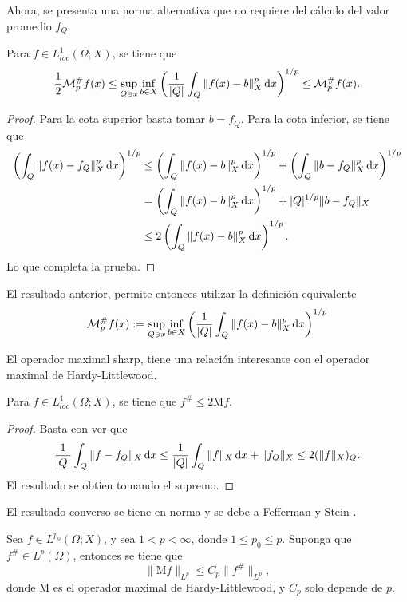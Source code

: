 Ahora, se presenta una norma alternativa que no requiere del cálculo del valor promedio $f_Q$.
\begin{proposition}
	Para $f\in L^1_{loc}(\Omega;X)$, se tiene que 
	\begin{equation*}
		\frac{1}{2}\mathcal{M}_p^\# f(x) \leq \sup_{Q\ni x} \inf_{b\in X}\left(\frac{1}{|Q|} \int_Q \|f(x)-b\|_X^p\mathop{}\!\mathrm{d} x\right)^{1/p} \leq \mathcal{M}_p^\# f(x). 
	\end{equation*}
\end{proposition}
\begin{proof}
	Para la cota superior basta tomar $b=f_Q$. Para la cota inferior, se tiene que
	\begin{align*}
		\left(\int_Q \|f(x) - f_Q\|_X^p\mathop{}\!\mathrm{d} x\right)^{1/p} & \leq \left(\int_Q \|f(x) - b\|_X^p \mathop{}\!\mathrm{d} x\right)^{1/p} + \left(\int_Q \|b- f_Q\|_X^p\mathop{}\!\mathrm{d} x\right)^{1/p} \\
		& =  \left(\int_Q \|f(x) - b\|_X^p \mathop{}\!\mathrm{d} x\right)^{1/p} + |Q|^{1/p}\|b-f_Q\|_X\\
		& \leq 2 \left(\int_Q \|f(x) - b\|_X^p \mathop{}\!\mathrm{d} x\right)^{1/p}.
	\end{align*}
	Lo que completa la prueba.
\end{proof}
\begin{remark}
	El resultado anterior, permite entonces utilizar la definición equivalente 
	\begin{equation*}
		\mathcal{M}_p^\# f(x) := \sup_{Q\ni x} \inf_{b\in X}\left(\frac{1}{|Q|} \int_Q \|f(x)-b\|_X^p\mathop{}\!\mathrm{d} x\right)^{1/p} 
	\end{equation*}
\end{remark}
El operador maximal sharp, tiene una relación interesante con el operador maximal de Hardy-Littlewood.
\begin{theorem}
	Para $f\in L^1_{loc}(\Omega;X)$, se tiene que $f^\# \leq 2\mathrm{M}f$.
\end{theorem}
\begin{proof}
	Basta con ver que 
	\begin{equation*}
		\frac{1}{|Q|}\int_Q\|f-f_Q\|_X \mathop{}\!\mathrm{d} x \leq \frac{1}{|Q|} \int_Q \|f\|_X\mathop{}\!\mathrm{d} x + \|f_Q\|_X \leq 2(\|f\|_X)_Q.
	\end{equation*}
	El resultado se obtien tomando el supremo.
\end{proof}
El resultado converso se tiene en norma y se debe a Fefferman y Stein \cite{fefferman-stein}.
\begin{theorem}\label{theo:sharp-hardy-littlewood}
	Sea $f\in L^{p_0}(\Omega; X)$, y sea $1<p<\infty$, donde $1\leq p_0\leq p$. Suponga que $f^\#\in L^p(\Omega)$, entonces se tiene que 
	\begin{equation*}
		\|\mathrm{M}f\|_{L^p} \leq C_p \|f^\#\|_{L^p},
	\end{equation*}
	donde $\mathrm{M}$ es el operador maximal de Hardy-Littlewood, y $C_p$ solo depende de $p$.
\end{theorem}
